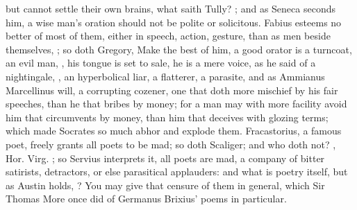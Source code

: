 but cannot settle their own brains, what saith Tully? ; and as Seneca
seconds him, a wise man's oration should not be polite or solicitous.
Fabius esteems no better of most of them, either in speech,
action, gesture, than as men beside themselves, ; so
doth Gregory,  Make the
best of him, a good orator is a turncoat, an evil man, , his tongue is set to sale, he is a mere voice, as
he said of a nightingale, , an
hyperbolical liar, a flatterer, a parasite, and as Ammianus
Marcellinus will, a corrupting cozener, one that doth more mischief by his fair
speeches, than he that bribes by money; for a man may with more facility avoid
him that circumvents by money, than him that deceives with glozing terms; which
made Socrates so much abhor and explode them.
Fracastorius, a famous poet, freely grants all poets to be
mad; so doth Scaliger; and who doth not? , Hor.
  Virg. ; so Servius interprets it, all
poets are mad, a company of bitter satirists, detractors, or else parasitical
applauders: and what is poetry itself, but as Austin holds, ? You may give that censure of them in general,
which Sir Thomas More once did of Germanus Brixius' poems in particular.


